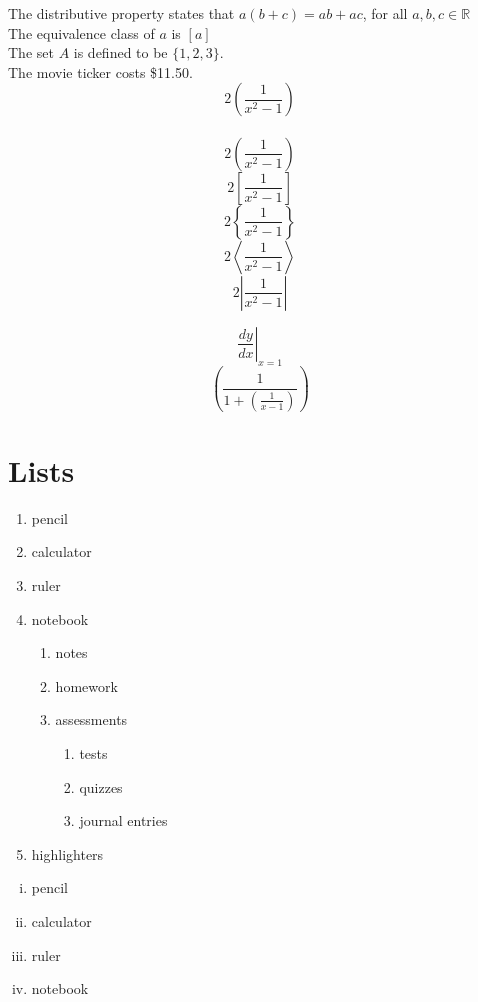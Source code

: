 \documentclass[12pt]{article}
\begin{document}
The distributive property states that $a(b+c)
=ab+ac$, for all $a,b,c\in \mathbb{R}$\\[6pt]
The equivalence class of $a$ is $[a]$\\[6pt]
The set $A$ is defined to be $\{1,2,3\}$.\\[6pt]
The movie ticker costs \$11.50.\\[6pt]  

$$2(\frac{1}{x^2-1})$$ \\
$$2\left(\frac{1}{x^2-1}\right)$$
$$2\left[\frac{1}{x^2-1}\right]$$
$$2\left\{\frac{1}{x^2-1}\right\}$$
$$2\left\langle \frac{1}{x^2-1} \right\rangle$$
$$2\left| \frac{1}{x^2-1} \right|$$

$$\left.\frac{dy}{dx}\right|_{x=1}$$
$$\left( \frac{1}{1+\left(\frac{1}{x-1}\right)} \right)$$

\section{Lists}

\begin{enumerate}
    \item pencil
    \item calculator
    \item ruler
    \item notebook
        \begin{enumerate}
            \item notes
            \item homework
            \item assessments
            \begin{enumerate}
                \item tests
                \item quizzes
                \item journal entries
            \end{enumerate}
        \end{enumerate}
    \item highlighters
\end{enumerate}

\vspace{0.5cm}

\begin{enumerate}[i.]
    \item pencil
    \item calculator
    \item ruler
    \item notebook
\end{enumerate}
\end{document}
